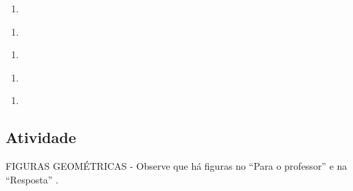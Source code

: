 \documentclass[a4,12pt]{book}
\begin{document}
\begin{enumerate} [\quad a)] %
  \item
\end{enumerate} %
\begin{enumerate} [\quad a)] %
  \item
\end{enumerate} %
\begin{enumerate} [\quad a)] %
  \item
\end{enumerate} %
\begin{enumerate} [\quad a)] %
  \item
\end{enumerate} %
\begin{enumerate} [\quad a)] %
  \item
\end{enumerate} %





\subsection{Atividade}






\begin{imagem*}[breakable]{}{}   FIGURAS GEOMÉTRICAS - Observe que há figuras no   ``Para o professor''   e na   ``Resposta''  .
\end{imagem*}
\end{document}
